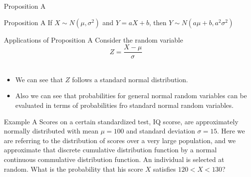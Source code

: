 \documentclass{beamer}
\begin{document}
\begin{frame}{Proposition A}
\begin{block}{Proposition A}    
If \(X \sim N(\mu, \sigma^2)\) and \(Y=aX+b\), then \(Y\sim N(a\mu +b, a^2\sigma^2)\)
\end{block}
\end{frame}

\begin{frame}{Applications of Proposition A}
Consider the random variable \[Z=\dfrac{X-\mu}{\sigma}\]\\ \pause 


\begin{itemize}
    \item We can see that \(Z\) follows a standard normal distribution. \\\pause


    \item Also we can see that probabilities for general normal random variables can be evaluated in terms of probabilities fro standard normal random variables. 
\end{itemize} 
\end{frame}


\begin{frame}{Example A}
Scores on a certain standardized test, IQ scorse, are approximately normally distributed with mean \(\mu =100\) and standard deviation \(\sigma=15\). Here we are referring to the distribution of scores over a very large population, and we approximate that discrete cumulative distribution function by a normal continuous commulative distribution function. An individual is selected at random. What is the probability that his score \(X\) satisfies \(120 <X< 130\)?   
\end{frame}
\end{document}
